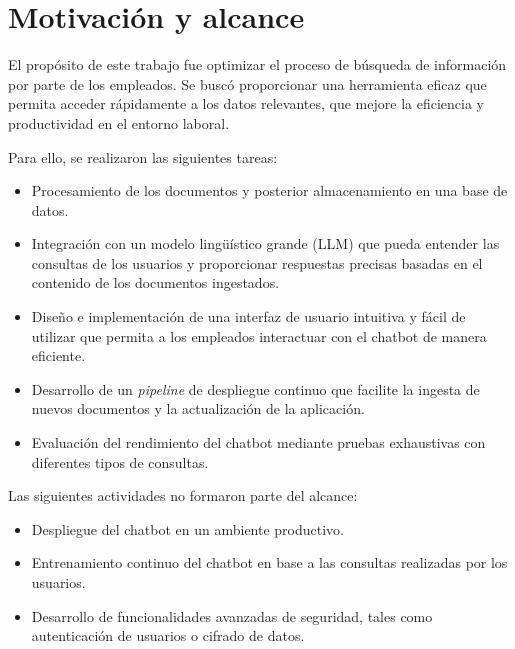 \vspace{10mm}

\section{Motivación y alcance}

El propósito de este trabajo fue optimizar el proceso de búsqueda de información por parte de los empleados. Se buscó
proporcionar una herramienta eficaz que permita acceder rápidamente a los datos relevantes, que mejore la eficiencia y 
productividad en el entorno laboral.

Para ello, se realizaron las siguientes tareas:

\begin{itemize}
	\item Procesamiento de los documentos y posterior almacenamiento en una base de datos.
	\item Integración con un modelo lingüístico grande (LLM) que pueda entender las consultas de los usuarios y proporcionar respuestas precisas basadas en el contenido de los documentos ingestados.
	\item Diseño e implementación de una interfaz de usuario intuitiva y fácil de utilizar que permita a los empleados interactuar con el chatbot de manera eficiente.
	\item Desarrollo de un \textit{pipeline} de despliegue continuo que facilite la ingesta de nuevos documentos y la actualización de la aplicación.
  \item Evaluación del rendimiento del chatbot mediante pruebas exhaustivas con diferentes tipos de consultas.
\end{itemize}

\vspace{5mm}

Las siguientes actividades no formaron parte del alcance:

\begin{itemize}
	\item Despliegue del chatbot en un ambiente productivo.
	\item Entrenamiento continuo del chatbot en base a las consultas realizadas por los usuarios.
	\item Desarrollo de funcionalidades avanzadas de seguridad, tales como autenticación de usuarios o cifrado de datos.
\end{itemize}

